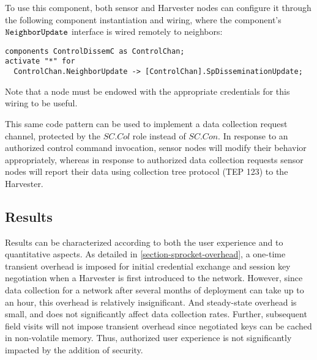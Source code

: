 To use this component, both sensor and Harvester nodes can configure it through the following
component instantiation and wiring, where the component's $\verb+NeighborUpdate+$ interface is
wired remotely to neighbors:
\begin{Verbatim}
components ControlDissemC as ControlChan;
activate "*" for 
  ControlChan.NeighborUpdate -> [ControlChan].SpDisseminationUpdate;
\end{Verbatim}
Note that a node must be endowed with the appropriate credentials for this wiring to be useful.

This same code pattern can be used to implement a data collection request channel, protected by
the $\mathit{SC.Col}$ role instead of $\mathit{SC.Con}$. In response to an authorized control
command invocation, sensor nodes will modify their behavior appropriately, whereas in response
to authorized data collection requests sensor nodes will report their data using collection tree
protocol (TEP 123) to the Harvester.

\subsection{Results}

Results can be characterized according to both the user experience and to quantitative aspects.
As detailed in \autoref{section-sprocket-overhead}, a one-time transient overhead is imposed for
initial credential exchange and session key negotiation when a Harvester is first introduced to
the network. However, since data collection for a network after several months of deployment can
take up to an hour, this overhead is relatively insignificant. And steady-state overhead is
small, and does not significantly affect data collection rates. Further, subsequent field visits
will not impose transient overhead since negotiated keys can be cached in non-volatile memory.
Thus, authorized user experience is not significantly impacted by the addition of security.

